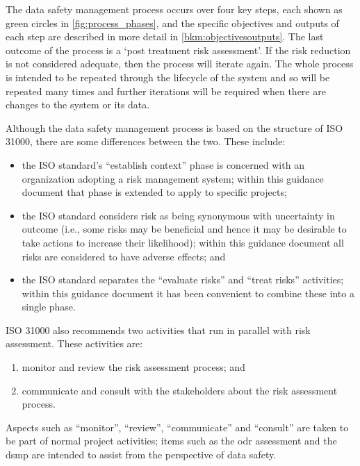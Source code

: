 The data safety management process occurs over four key steps, each shown as green circles in \autoref{fig:process_phases}, and the specific
objectives and outputs of each step are described in more detail in \autoref{bkm:objectivesoutputs}. The last outcome of the
process is a `post \gls{treatment} risk assessment'. If the risk reduction is not considered adequate, then
the process will iterate again. The whole process is intended to be repeated through the lifecycle of
the system and so will be repeated many times and further iterations will be required when there
are changes to the system or its data.

Although the data safety management process is based on the structure of ISO 31000, there are
some differences between the two. These include:
\begin{itemize}
\item the ISO standard’s ``establish context'' phase is concerned with an organization adopting a
	risk management system; within this guidance document that phase is extended to apply to
	specific projects;
\item the ISO standard considers risk as being synonymous with uncertainty in outcome (i.e.,
	some risks may be beneficial and hence it may be desirable to take actions to increase their
	likelihood); within this guidance document all risks are considered to have adverse effects;
	and
\item the ISO standard separates the ``evaluate risks'' and ``\gls{treat} risks'' activities; within this
	guidance document it has been convenient to combine these into a single phase.
\end{itemize}
ISO 31000 also recommends two activities that run in parallel with risk assessment. These activities
are:
\begin{enumerate}
\item monitor and review the risk assessment process; and 
\item communicate and consult with the
\glspl{stakeholder} about the risk assessment process. 
\end{enumerate}
Aspects such as ``monitor'', ``review'', ``communicate''
and ``consult'' are taken to be part of normal project activities; items such as the \gls{odr} assessment and
the \gls{dsmp} are intended to assist from the perspective of data safety.
